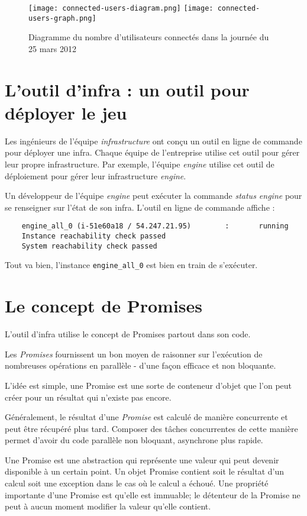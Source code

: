 \begin{figure}[H]
  \texttt{[image: connected-users-diagram.png]}
  \texttt{[image: connected-users-graph.png]}
  \caption{Diagramme du nombre d'utilisateurs connectés dans la journée du 25 mars 2012}
\end{figure}

\section{L'outil d'infra : un outil pour déployer le jeu}

Les ingénieurs de l'équipe \textit{infrastructure} ont conçu un outil en ligne
de commande pour déployer une infra.
Chaque équipe de l'entreprise utilise cet outil pour gérer leur propre
infrastructure. Par exemple, l'équipe \textit{engine} utilise cet outil de
déploiement pour gérer leur infrastructure \textit{engine}.

Un développeur de l'équipe \textit{engine} peut exécuter la commande
\textit{status engine} pour se renseigner sur l'état de son infra. L'outil en
ligne de commande affiche :
\begin{verbatim}
    engine_all_0 (i-51e60a18 / 54.247.21.95)        :       running
    Instance reachability check passed 
    System reachability check passed
\end{verbatim}
Tout va bien, l'instance \verb?engine_all_0? est bien en train de s'exécuter.

\section{Le concept de Promises}

L'outil d'infra utilise le concept de Promises partout dans son code.

Les \textit{Promises} fournissent un bon moyen de raisonner sur l'exécution de
nombreuses opérations en parallèle - d'une façon efficace et non bloquante.

L'idée est simple, une Promise est une sorte de conteneur d'objet que l'on peut
créer pour un résultat qui n'existe pas encore.

Généralement, le résultat d'une \textit{Promise} est calculé de manière
concurrente et peut être récupéré plus tard.
Composer des tâches concurrentes de cette manière permet d'avoir du code
parallèle non bloquant, asynchrone plus rapide.

Une Promise est une abstraction qui représente une valeur qui peut devenir
disponible à un certain point.
Un objet Promise contient soit le résultat d'un calcul soit une exception dans
le cas où le calcul a échoué.
Une propriété importante d'une Promise est qu'elle est immuable; le détenteur de
la Promise ne peut à aucun moment modifier la valeur qu'elle contient.

